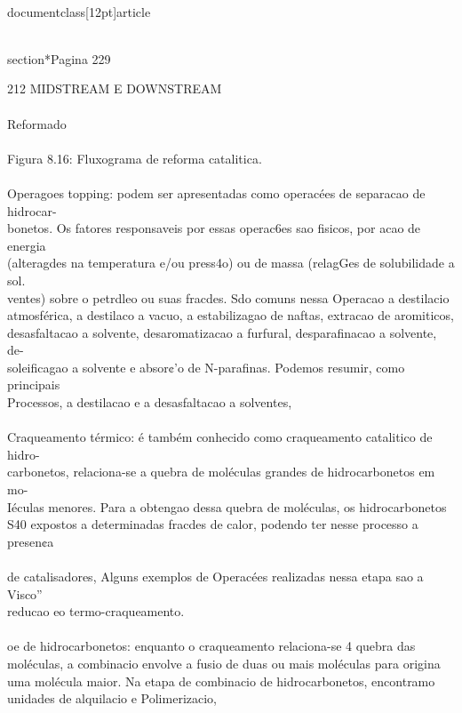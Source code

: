 \\documentclass[12pt]{article}
\begin{document}
\\section*{Pagina 229}

212 MIDSTREAM E DOWNSTREAM\\
\\
Reformado\\
\\
Figura 8.16: Fluxograma de reforma catalitica.\\
\\
Operagoes topping: podem ser apresentadas como operacées de separacao de hidrocar-\\
bonetos. Os fatores responsaveis por essas operac6es sao fisicos, por acao de energia\\
(alteragdes na temperatura e/ou press4o) ou de massa (relagGes de solubilidade a sol.\\
ventes) sobre o petrdleo ou suas fracdes. Sdo comuns nessa Operacao a destilacio\\
atmosférica, a destilaco a vacuo, a estabilizagao de naftas, extracao de aromiticos,\\
desasfaltacao a solvente, desaromatizacao a furfural, desparafinacao a solvente, de-\\
soleificagao a solvente e absor¢’o de N-parafinas. Podemos resumir, como principais\\
Processos, a destilacao e a desasfaltacao a solventes,\\
\\
Craqueamento térmico: é também conhecido como craqueamento catalitico de hidro-\\
carbonetos, relaciona-se a quebra de moléculas grandes de hidrocarbonetos em mo-\\
Iéculas menores. Para a obtengao dessa quebra de moléculas, os hidrocarbonetos\\
S40 expostos a determinadas fracdes de calor, podendo ter nesse processo a presen¢a\\
\\
de catalisadores, Alguns exemplos de Operacées realizadas nessa etapa sao a Visco”\\
reducao eo termo-craqueamento.\\
\\
oe de hidrocarbonetos: enquanto o craqueamento relaciona-se 4 quebra das\\
moléculas, a combinacio envolve a fusio de duas ou mais moléculas para origina\\
uma molécula maior. Na etapa de combinacio de hidrocarbonetos, encontramo\\
unidades de alquilacio e Polimerizacio,\\
\end{document}
